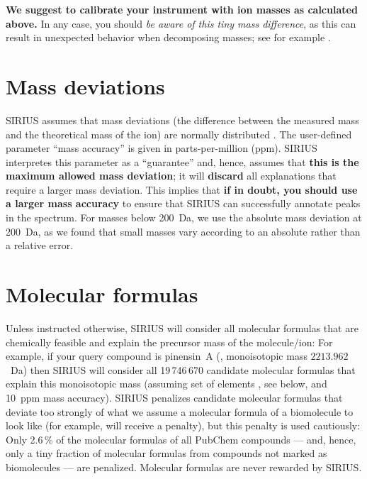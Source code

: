 \documentclass[letterpaper,10pt,openany,oneside]{sphinxmanual}
\begin{document}
\textbf{We suggest to calibrate your instrument with ion masses as calculated
above.}  In any case, you should \emph{be aware of this tiny mass
difference}, as this can result in unexpected behavior when decomposing
masses; see for example \citet{pluskal12highly}.


\section{Mass deviations}
\label{sec:mass-deviations}

SIRIUS assumes that mass deviations (the difference between the measured
mass and the theoretical mass of the ion) are normally distributed
\citep{jaitly06robust, zubarev07proper, boecker16fragmentation}.  The
user-defined parameter ``mass accuracy'' is given in parts-per-million (ppm).
SIRIUS interpretes this parameter as a ``guarantee'' and, hence, assumes
that \textbf{this is the maximum allowed mass deviation}; it
will \textbf{discard} all explanations that require a larger mass deviation.
This implies that \textbf{if in doubt, you should use a larger mass accuracy}
to ensure that SIRIUS can successfully annotate peaks in the spectrum.  
For masses below 200~Da, we
use the absolute mass deviation at 200~Da, as we found that small masses vary
according to an absolute rather than a relative error.


\section{Molecular formulas}

Unless instructed otherwise, SIRIUS will consider all molecular formulas
that are chemically feasible and explain the precursor mass of the
molecule/ion: For example, if your query compound is pinensin~A
(, monoisotopic mass $2213.962$~Da) then SIRIUS will
consider all 19\,746\,670 candidate molecular formulas that explain this
monoisotopic mass (assuming set of elements , see below, and
10~ppm mass accuracy).  SIRIUS penalizes candidate molecular formulas that
deviate too strongly of what we assume a molecular formula of a biomolecule
to look like (for example,  will receive a penalty), but this
penalty is used cautiously: Only 2.6\,\% of the molecular formulas of all
PubChem compounds --- and, hence, only a tiny fraction of molecular formulas
from compounds not marked as biomolecules --- are penalized.  Molecular
formulas are never rewarded by SIRIUS.
\end{document}
